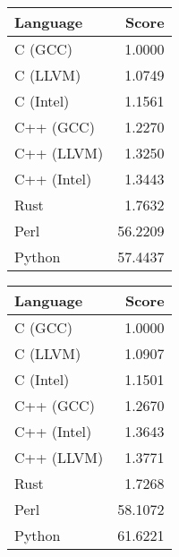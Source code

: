 \begin{subtable}{0.33\textwidth}
    \centering
    \caption{$k=3$}
    \label{table:runtime:dfa_gap(3)}
    \begin{tabular}{|l|r|}
        \hline
        Language & Score \\
        \hline
        C (GCC) & 1.0000 \\
        C (LLVM) & 1.0749 \\
        C (Intel) & 1.1561 \\
        C++ (GCC) & 1.2270 \\
        C++ (LLVM) & 1.3250 \\
        C++ (Intel) & 1.3443 \\
        Rust & 1.7632 \\
        Perl & 56.2209 \\
        Python & 57.4437 \\
        \hline
    \end{tabular}
\end{subtable}
\begin{subtable}{0.33\textwidth}
    \centering
    \caption{$k=4$}
    \label{table:runtime:dfa_gap(4)}
    \begin{tabular}{|l|r|}
        \hline
        Language & Score \\
        \hline
        C (GCC) & 1.0000 \\
        C (LLVM) & 1.0907 \\
        C (Intel) & 1.1501 \\
        C++ (GCC) & 1.2670 \\
        C++ (Intel) & 1.3643 \\
        C++ (LLVM) & 1.3771 \\
        Rust & 1.7268 \\
        Perl & 58.1072 \\
        Python & 61.6221 \\
        \hline
    \end{tabular}
\end{subtable}%
